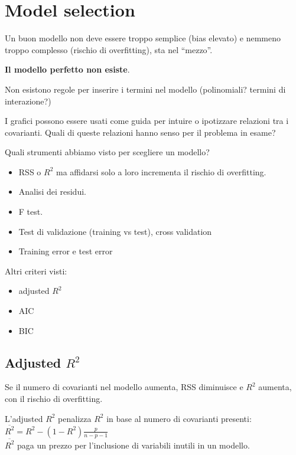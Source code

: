 \section{Model selection}

Un buon modello non deve essere troppo semplice (bias elevato) e nemmeno
troppo complesso (rischio di overfitting), sta nel ``mezzo''.

\textbf{Il modello perfetto non esiste}.

Non esistono regole per inserire i termini nel modello (polinomiali?
termini di interazione?)

I grafici possono essere usati come guida per intuire o ipotizzare relazioni
tra i covarianti. Quali di queste relazioni hanno senso per il problema in esame?

Quali strumenti abbiamo visto per scegliere un modello?

\begin{itemize}
 \item RSS o $R^2$ ma affidarsi solo a loro incrementa il rischio di overfitting.
 \item Analisi dei residui.
 \item F test.
 \item Test di validazione (training vs test), cross validation
 \item Training error e test error
\end{itemize}

Altri criteri visti:

\begin{itemize}
 \item adjusted $R^2$
 \item AIC
 \item BIC
\end{itemize}

\subsection{Adjusted $R^2$}

Se il numero di covarianti nel modello aumenta, RSS diminuisce
e $R^2$ aumenta, con il rischio di overfitting.

L'adjusted $R^2$ penalizza $R^2$ in base al numero di covarianti presenti:\\

$\overline{R^2} = R^2 - (1-R^2)\frac{p}{n-p-1}$\\

$\overline{R^2}$ paga un prezzo per l'inclusione di variabili inutili in un
modello.

